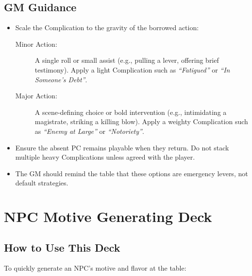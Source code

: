 \documentclass[12pt]{article}
\begin{document}
\subsection*{GM Guidance}
\begin{itemize}
  \item Scale the Complication to the gravity of the borrowed action:
    \begin{description}
      \item[Minor Action:] A single roll or small assist (e.g., pulling a lever, offering brief testimony). Apply a light Complication such as \emph{“Fatigued”} or \emph{“In Someone’s Debt”}.
      \item[Major Action:] A scene-defining choice or bold intervention (e.g., intimidating a magistrate, striking a killing blow). Apply a weighty Complication such as \emph{“Enemy at Large”} or \emph{“Notoriety”}.
    \end{description}
  \item Ensure the absent PC remains playable when they return. Do not stack multiple heavy Complications unless agreed with the player.
  \item The GM should remind the table that these options are emergency levers, not default strategies.
\end{itemize}

\section{NPC Motive Generating Deck}

\subsection*{How to Use This Deck}

\noindent To quickly generate an NPC’s motive and flavor at the table:
\end{document}

